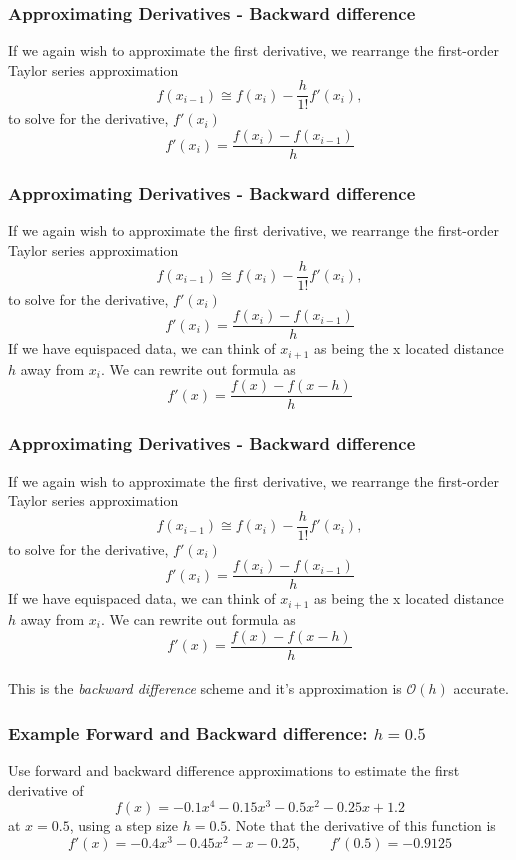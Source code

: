 \documentclass{if-beamer}
\begin{document}
\begin{frame}[t]
	\frametitle{Approximating Derivatives - Backward difference}
	If we again wish to approximate the first derivative, we rearrange the first-order Taylor series approximation
	$$f(x_{i-1}) \cong f(x_i)- \frac{h}{1!}f'(x_i),$$
	to solve for the derivative, $f'(x_i)$
	$$f'(x_i) = \frac{f(x_{i})-f(x_{i-1})}{h} $$
\end{frame}

\begin{frame}[t]
	\frametitle{Approximating Derivatives - Backward difference}
	If we again wish to approximate the first derivative, we rearrange the first-order Taylor series approximation
	$$f(x_{i-1}) \cong f(x_i)- \frac{h}{1!}f'(x_i),$$
	to solve for the derivative, $f'(x_i)$
	$$f'(x_i) = \frac{f(x_{i})-f(x_{i-1})}{h} $$
	If we have equispaced data, we can think of $x_{i+1}$ as being the x located distance $h$ away from $x_i$. We can rewrite out formula as
	$$f'(x) = \frac{f(x)-f(x-h)}{h}  $$
\end{frame}

\begin{frame}[t]
	\frametitle{Approximating Derivatives - Backward difference}
	If we again wish to approximate the first derivative, we rearrange the first-order Taylor series approximation
	$$f(x_{i-1}) \cong f(x_i)- \frac{h}{1!}f'(x_i),$$
	to solve for the derivative, $f'(x_i)$
	$$f'(x_i) = \frac{f(x_{i})-f(x_{i-1})}{h} $$
	If we have equispaced data, we can think of $x_{i+1}$ as being the x located distance $h$ away from $x_i$. We can rewrite out formula as
	$$f'(x) = \frac{f(x)-f(x-h)}{h}  $$
	\\\vspace{10pt}
	This is the \textit{backward difference} scheme and it's approximation is $\mathcal{O}(h)$ accurate.
\end{frame}



\begin{frame}[t]
	\frametitle{Example Forward and Backward difference: $h= 0.5$}
	Use forward and backward difference approximations to estimate the first derivative of
	$$f(x) = -0.1x^4-0.15x^3-0.5x^2-0.25x+1.2 $$
	at $x=0.5$, using a step size $h = 0.5$. Note that the derivative of this function is
	$$f'(x) = -0.4x^3-0.45x^2-x-0.25, \qquad f'(0.5) = -0.9125$$
\end{frame}
\end{document}
